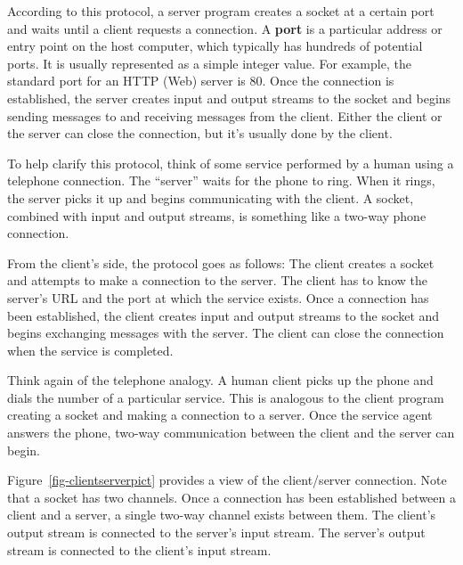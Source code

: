 According to this protocol, a server program creates a socket at a
certain port and waits until a client requests a connection.  A {\bf
port} is a particular address or entry point on the host
computer, which typically has hundreds of potential ports.  It is
usually represented as a simple integer value.  For example, the
standard port for an HTTP (Web) server is 80. Once the connection is
established, the server creates input and output streams to the socket
and begins sending messages to and receiving messages from the client.
Either the client or the server can close the connection, but it's
usually done by the client.


To help clarify this protocol, think of some service performed by a
human using a telephone connection.   The ``server'' waits for the
phone to ring.  When it rings, the server picks it up and begins
communicating with the client.  A socket, combined with input
and output streams, is something like a two-way phone connection.

From the client's side, the protocol goes as follows:  The client
creates a socket and attempts to make a connection to the server.  The
client has to know the server's URL and the port at which the service
exists.  Once a connection has been established, the client creates
input and output streams to the socket and begins exchanging messages
with the server.  The client can close the connection when the service
is completed.

Think again of the telephone analogy.  A human client picks up the
phone and dials the number of a particular service.  This is analogous
to the client program creating a socket and making a connection to a
server.  Once the service agent answers the phone, two-way
communication between the client and the server can begin.

Figure~\ref{fig-clientserverpict} provides a view of the client/server
connection.   Note that a socket has two channels.  Once a connection
has been established between a client and a server, a single two-way
channel exists between them.  The client's output stream is connected
to the server's input stream.  The server's output stream is connected
to the client's input stream.


